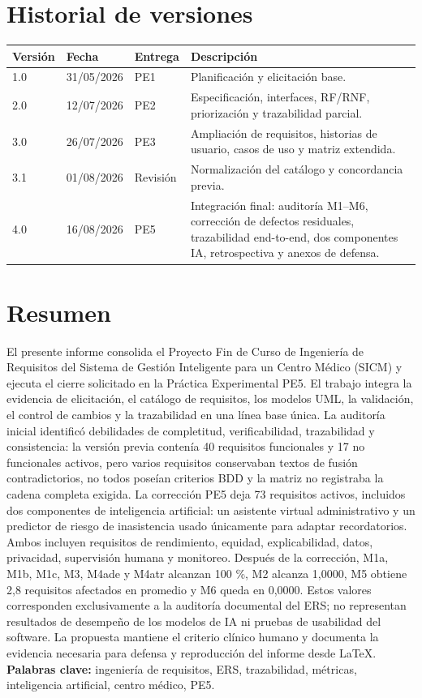\documentclass[11pt,a4paper]{article}
\begin{document}
\section*{Historial de versiones}
\begin{longtable}{p{1.2cm}p{2cm}p{2.4cm}p{9cm}}
	\toprule\textbf{Versión}&\textbf{Fecha}&\textbf{Entrega}&\textbf{Descripción}\\\midrule\endhead
	1.0&31/05/2026&PE1&Planificación y elicitación base.\\
	2.0&12/07/2026&PE2&Especificación, interfaces, RF/RNF, priorización y trazabilidad parcial.\\
	3.0&26/07/2026&PE3&Ampliación de requisitos, historias de usuario, casos de uso y matriz extendida.\\
	3.1&01/08/2026&Revisión&Normalización del catálogo y concordancia previa.\\
	4.0&16/08/2026&PE5&Integración final: auditoría M1--M6, corrección de defectos residuales, trazabilidad end-to-end, dos componentes IA, retrospectiva y anexos de defensa.\\\bottomrule
\end{longtable}
\section*{Resumen}
El presente informe consolida el Proyecto Fin de Curso de Ingeniería de Requisitos del Sistema de Gestión Inteligente para un Centro Médico (SICM) y ejecuta el cierre solicitado en la Práctica Experimental PE5. El trabajo integra la evidencia de elicitación, el catálogo de requisitos, los modelos UML, la validación, el control de cambios y la trazabilidad en una línea base única. La auditoría inicial identificó debilidades de completitud, verificabilidad, trazabilidad y consistencia: la versión previa contenía 40 requisitos funcionales y 17 no funcionales activos, pero varios requisitos conservaban textos de fusión contradictorios, no todos poseían criterios BDD y la matriz no registraba la cadena completa exigida. La corrección PE5 deja 73 requisitos activos, incluidos dos componentes de inteligencia artificial: un asistente virtual administrativo y un predictor de riesgo de inasistencia usado únicamente para adaptar recordatorios. Ambos incluyen requisitos de rendimiento, equidad, explicabilidad, datos, privacidad, supervisión humana y monitoreo. Después de la corrección, M1a, M1b, M1c, M3, M4ade y M4atr alcanzan 100 \%, M2 alcanza 1,0000, M5 obtiene 2,8 requisitos afectados en promedio y M6 queda en 0,0000. Estos valores corresponden exclusivamente a la auditoría documental del ERS; no representan resultados de desempeño de los modelos de IA ni pruebas de usabilidad del software. La propuesta mantiene el criterio clínico humano y documenta la evidencia necesaria para defensa y reproducción del informe desde LaTeX.\\[0.25cm]
\textbf{Palabras clave:} ingeniería de requisitos, ERS, trazabilidad, métricas, inteligencia artificial, centro médico, PE5.
\clearpage
\end{document}
